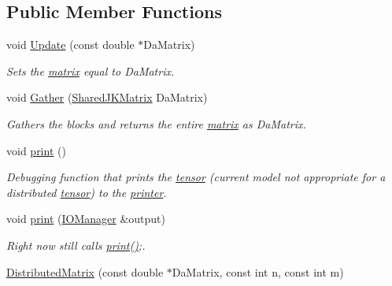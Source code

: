 \subsection*{Public Member Functions}
\begin{DoxyCompactItemize}
\item 
void \hyperlink{classJKBuilder_1_1DistributedMatrix_a6a378face23ba83b2431cb08e8519066}{Update} (const double $\ast$DaMatrix)
\begin{DoxyCompactList}\small\item\em Sets the \hyperlink{classJKBuilder_1_1matrix}{matrix} equal to DaMatrix. \item\end{DoxyCompactList}\item 
void \hyperlink{classJKBuilder_1_1DistributedMatrix_a825e549c725b991ad81d4ea25f630d9e}{Gather} (\hyperlink{namespaceJKBuilder_ad6c4232cd3938548f4ad3a91fbc5a2e8}{SharedJKMatrix} DaMatrix)
\begin{DoxyCompactList}\small\item\em Gathers the blocks and returns the entire \hyperlink{classJKBuilder_1_1matrix}{matrix} as DaMatrix. \item\end{DoxyCompactList}\item 
void \hyperlink{classJKBuilder_1_1DistributedMatrix_a388f572c62279f839ee138a9afbdeeb5}{print} ()
\begin{DoxyCompactList}\small\item\em Debugging function that prints the \hyperlink{classJKBuilder_1_1tensor}{tensor} (current model not appropriate for a distributed \hyperlink{classJKBuilder_1_1tensor}{tensor}) to the \hyperlink{classJKBuilder_1_1printer}{printer}. \item\end{DoxyCompactList}\item 
void \hyperlink{classJKBuilder_1_1DistributedMatrix_a74b2fe351a5444c1325870dc6162f451}{print} (\hyperlink{classJKBuilder_1_1IOManager}{IOManager} \&output)
\begin{DoxyCompactList}\small\item\em Right now still calls \hyperlink{classJKBuilder_1_1DistributedMatrix_a388f572c62279f839ee138a9afbdeeb5}{print()};. \item\end{DoxyCompactList}\item 
\hyperlink{classJKBuilder_1_1DistributedMatrix_a8de5bd3fc1dd1dc2869ef78a5e3709ab}{DistributedMatrix} (const double $\ast$DaMatrix, const int n, const int m)

\end{DoxyCompactItemize}
